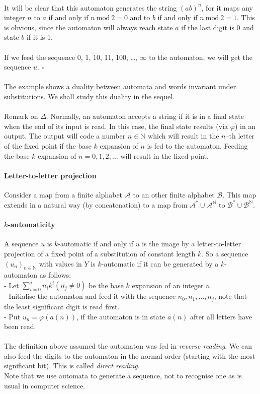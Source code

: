 \documentclass{article}
\begin{document}
\\
It will be clear that this automaton generates the string $(ab)^n$, for it
maps any integer $n$ to $a$ if and only if $n \mathrm{\ mod\ } 2 = 0$ and to
$b$ if and only if $n \mathrm{\ mod\ } 2 = 1$. This is obvious, since the
automaton will always reach state $a$ if the last digit is 0 and state $b$ 
if it is 1.\\
\\
If we feed the sequence 0, 1, 10, 11, 100, \ldots, $\infty$ to the automaton,
we will get the sequence $u$. $\square$\\
\\
The example shows a duality between automata and words invariant under 
substitutions. We shall study this duality in the sequel.\\
\\
Remark on $\Delta$. Normally, an automaton accepts a string if it is in
a final state when the end of its input is read. In this case, the final state
results (via $\varphi$) in an output. The output will code a number
$n \in \mathbb{N}$ which will result in the $n$--th letter of the fixed point
if the base $k$ expansion of $n$ is fed to the automaton. Feeding the base
$k$ expansion of $n = 0, 1, 2, \ldots$ will result in the fixed point.

\paragraph{Letter-to-letter projection} Consider a map from a finite alphabet
$\mathcal{A}$ to an other finite alphabet $\mathcal{B}$. This map extends in
a natural way (by concatenation) to a map from
$\mathcal{A}^* \cup \mathcal{A}^\mathbb{N}$ to
$\mathcal{B}^* \cup \mathcal{B}^\mathbb{N}$.

\paragraph{$k$-automaticity} A sequence $u$ is $k$-automatic if and only if
$u$ is the image by a letter-to-letter projection of a fixed point of a
substitution of constant length $k$. So a sequence $(u_n)_{n \in \mathbb{N}}$
with values in $Y$ is $k$-automatic if it can be generated by a $k$-automaton
as follows:\\
- Let $\sum_{i=0}^j n_i k^i (n_j \neq 0)$ be the base $k$ expansion of an
  integer $n$.\\
- Initialise the automaton and feed it with the sequence 
$n_0, n_1, \ldots, n_j$, note that the least significant digit is read first.\\
- Put $u_n = \varphi(a(n))$, if the automaton is in state $a(n)$ after all 
letters have been read.\\
\\
The definition above assumed the automaton was fed in \emph{reverse reading}.
We can also feed the digits to the automaton in the normal order (starting with
the most significant bit). This is called \emph{direct reading}.\\
Note that we use automata to generate a sequence, not to recognise one as is
usual in computer science.
\end{document}
